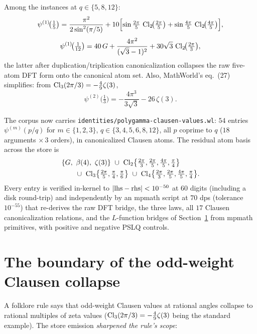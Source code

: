 \begin{result}\label{bridge:res:newinstances}
Among the instances at $q\in\{5,8,12\}$:
\[
\psi^{(1)}\!\bigl(\tfrac15\bigr)
=\frac{\pi^2}{2\sin^2(\pi/5)}
+10\Bigl[\sin\tfrac{2\pi}{5}\,\operatorname{Cl}_2\!\bigl(\tfrac{2\pi}{5}\bigr)
+\sin\tfrac{4\pi}{5}\,\operatorname{Cl}_2\!\bigl(\tfrac{4\pi}{5}\bigr)\Bigr],
\]
\[
\psi^{(1)}\!\bigl(\tfrac1{12}\bigr)
=40\,G+\frac{4\pi^2}{(\sqrt3-1)^2}+30\sqrt3\,\operatorname{Cl}_2\!\bigl(\tfrac{2\pi}{3}\bigr),
\]
the latter after duplication/triplication canonicalization collapses the raw five-atom DFT
form onto the canonical atom set. Also, MathWorld's eq.~(27) simplifies: from
$\operatorname{Cl}_3(2\pi/3)=-\tfrac49\zeta(3)$,
\[
\psi^{(2)}\!\bigl(\tfrac13\bigr)=-\frac{4\pi^3}{3\sqrt3}-26\,\zeta(3).
\]
\end{result}

\begin{result}\label{bridge:res:store}
The corpus now carries \texttt{identities/polygamma-clausen-values.wl}: $54$ entries
$\psi^{(m)}(p/q)$ for $m\in\{1,2,3\}$, $q\in\{3,4,5,6,8,12\}$, all $p$ coprime to $q$
($18$ arguments $\times\,3$ orders), in canonicalized Clausen atoms. The residual atom
basis across the store is
\begin{align*}
&\{G,\ \beta(4),\ \zeta(3)\}\ \cup\
\operatorname{Cl}_2\bigl\{\tfrac{2\pi}{3},\tfrac{2\pi}{5},\tfrac{4\pi}{5},\tfrac{\pi}{4}\bigr\}\\
&\qquad\cup\
\operatorname{Cl}_3\bigl\{\tfrac{2\pi}{5},\tfrac{\pi}{4},\tfrac{\pi}{6}\bigr\}\ \cup\
\operatorname{Cl}_4\bigl\{\tfrac{2\pi}{3},\tfrac{2\pi}{5},\tfrac{4\pi}{5},\tfrac{\pi}{4}\bigr\}.
\end{align*}
Every entry is verified in-kernel to $|{\rm lhs}-{\rm rhs}|<10^{-50}$ at $60$ digits
(including a disk round-trip) and independently by an mpmath script at $70$ dps
(tolerance $10^{-55}$) that re-derives the raw DFT bridge, the three laws, all $17$
Clausen canonicalization relations, and the $L$-function bridges of
Section~\ref{bridge:sec:collapse} from mpmath primitives, with positive and negative PSLQ
controls.
\end{result}

\section{The boundary of the odd-weight Clausen collapse}\label{bridge:sec:collapse}

A folklore rule says that odd-weight Clausen values at rational angles collapse to
rational multiples of zeta values ($\operatorname{Cl}_3(2\pi/3)=-\tfrac49\zeta(3)$ being the standard
example). The store emission \emph{sharpened the rule's scope}:

